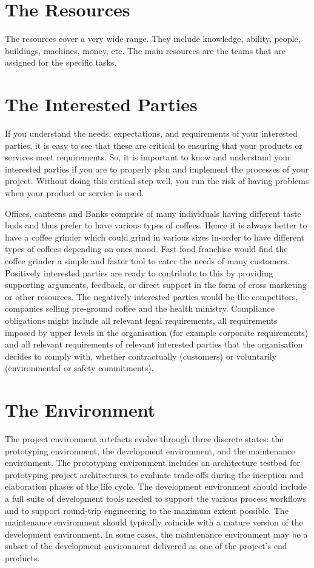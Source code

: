 \section{ The Resources } \label{ The Resources }
\noindent The resources cover a very wide range. They include knowledge, ability, people, buildings, machines, money, etc. The main resources are the teams that are assigned for the specific tasks.

\section{ The Interested Parties } \label{ The Interested Parties }
\noindent If you understand the needs, expectations, and requirements of your interested parties, it is easy to see that these are critical to ensuring that your products or services meet requirements. So, it is important to know and understand your interested parties if you are to properly plan and implement the processes of your project. Without doing this critical step well, you run the risk of having problems when your product or service is used.

\noindent Offices, canteens and Banks comprise of many individuals having different taste buds and thus prefer to have various types of coffees. Hence it is always better to have a coffee grinder which could grind in various sizes in-order to have different types of coffees depending on ones mood. Fast food franchise would find the coffee grinder a simple and faster tool to cater the needs of many customers. Positively interested parties are ready to contribute to this by providing supporting arguments, feedback, or direct support in the form of cross marketing or other resources. The negatively interested parties would be the competitors, companies selling pre-ground coffee and the health ministry. Compliance obligations might include all relevant legal requirements, all requirements imposed by upper levels in the organisation (for example corporate requirements) and all relevant requirements of relevant interested parties that the organisation decides to comply with, whether contractually (customers) or voluntarily (environmental or safety commitments).

\section{ The Environment } \label{ The Environment }
\noindent The project environment artefacts evolve through three discrete states: the prototyping environment, the development environment, and the maintenance environment. The prototyping environment includes an architecture testbed for prototyping project architectures to evaluate trade-offs during the inception and elaboration phases of the life cycle. The development environment should include a full suite of development tools needed to support the various process workflows and to support round-trip engineering to the maximum extent possible. The maintenance environment should typically coincide with a mature version of the development environment. In some cases, the maintenance environment may be a subset of the development environment delivered as one of the project's end products.